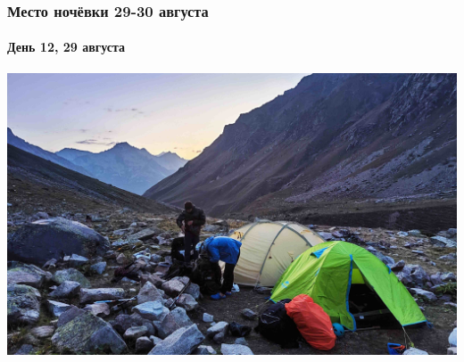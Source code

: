 \begin{frame}
	\frametitle{Место ночёвки 29-30 августа}
	\framesubtitle{День 12, 29 августа}	
	\centering
	\includegraphics[width=\textwidth]{../pics/IMG_20240829_191225}			
\end{frame}


